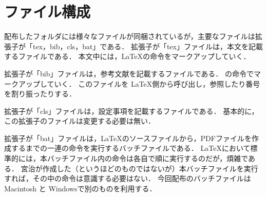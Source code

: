\section{ファイル構成}
配布したフォルダには様々なファイルが同梱されているが，主要なファイルは拡張子が「tex，bib，cls，bat」である．
拡張子が「tex」ファイルは，本文を記載するファイルである．
本文中には，\LaTeX の命令をマークアップしていく．

拡張子が「bib」ファイルは，参考文献を記載するファイルである．
\BibTeX の命令でマークアップしていく．
このファイルを \LaTeX 側から呼び出し，参照したり番号を割り振ったりする．

拡張子が「cls」ファイルは，設定事項を記載するファイルである．
基本的に，この拡張子のファイルは変更する必要は無い．

拡張子が「bat」ファイルは，\LaTeX のソースファイルから，PDFファイルを作成するまでの一連の命令を実行するバッチファイルである．
\LaTeX において標準的には，本バッチファイル内の命令は各自で順に実行するのだが，煩雑である．
宮治が作成した（というほどのものではないが）本バッチファイルを実行すれば，その中の命令は意識する必要はない．
今回配布のバッチファイルは Macintosh と Windowsで別のものを利用する．

